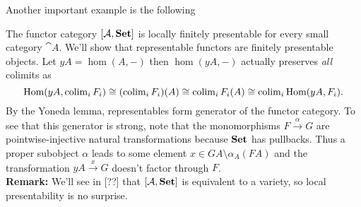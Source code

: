 Another important example is the following
\begin{Example}
The functor category $[\mathcal{A},\mathbf{Set}]$ is locally finitely presentable for every small category $\cat A$. We'll show that representable functors are finitely presentable objects. Let $yA = \hom(A,-)$ then $\hom(yA,-)$ actually preserves \emph{all} colimits as 
\[ \textrm{Hom}(yA, \operatorname{colim}_i F_i) \cong (\operatorname{colim}_i F_i)(A) \cong \operatorname{colim}_i F_i(A) \cong \operatorname{colim}_i \textrm{Hom}(yA, F_i). \]
By the Yoneda lemma, representables form generator of the functor category. To see that this generator is strong, note that the monomorphisms $F \xrightarrow{\alpha} G$ are pointwise-injective natural transformations because $\mathbf{Set}$ has pullbacks. Thus a proper subobject $\alpha$ leads to some element $x \in GA \setminus \alpha_A(FA)$ and the transformation $yA \xrightarrow{x} G$ doesn't factor through $F$. \\

\textbf{Remark: } We'll see in [??] that $[\mathcal{A},\mathbf{Set}]$ is equivalent to a variety, so local presentability is no surprise.
\end{Example}

